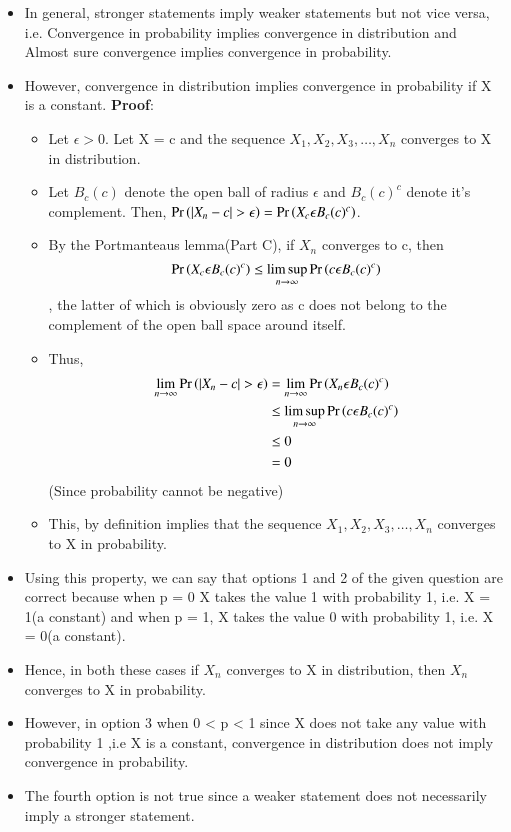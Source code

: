 \documentclass[journal,12pt,twocolumn]{IEEEtran}
\begin{document}
\begin{itemize}
    \item In general, stronger statements imply weaker statements but not vice versa, i.e. Convergence in probability implies convergence in distribution and Almost sure convergence implies convergence in probability.\newline
    \item However, convergence in distribution implies convergence in probability if X is a constant.\newline
    \textbf{Proof}:
    \begin{itemize}
        \item Let $\epsilon > 0$. Let X = c and the sequence $X_1,X_2,X_3, \dots ,X_n$ converges to X in distribution.
        \item Let $B_c(c)$ denote the open ball of radius $\epsilon$ and $B_c(c)^c$ denote it's complement. Then, $\pr{|X_n - c|>\epsilon} = \pr{X_c \epsilon B_c(c)^c}$.
        \item By the Portmanteaus lemma(Part C), if $X_n$ converges to c, then $$\Pr\left(X_c \epsilon B_c(c)^c\right) \leq \limsup_{n \rightarrow \infty} \Pr\left(c \epsilon B_c(c)^c\right)$$, the latter of which is obviously zero as c does not belong to the complement of the open ball space around itself.
        \item Thus,
        \begin{align}
            \lim_{n \rightarrow \infty}\pr{|X_n - c|>\epsilon} &= \lim_{n \rightarrow \infty}\pr{X_n \epsilon B_c(c)^c} \\
            &\leq \limsup_{n \rightarrow \infty}\pr{c \epsilon B_c(c)^c} \\
            &\leq 0 \\
            &= 0 
        \end{align}
        (Since probability cannot be negative)
        \item This, by definition implies that the sequence $X_1,X_2,X_3, \dots ,X_n$ converges to X in probability.
    \end{itemize}
    \item Using this property, we can say that options 1 and 2 of the given question are correct because when p = 0 X takes the value 1 with probability 1, i.e. X = 1(a constant) and when p = 1, X takes the value 0 with probability 1, i.e. X = 0(a constant).
\item Hence, in both these cases if $X_n$ converges to X in distribution, then $X_n$ converges to X in probability.
\item However, in option 3 when 0 < p < 1 since X does not take any value with probability 1 ,i.e X is a constant, convergence in distribution does not imply convergence in probability.
\item The fourth option is not true since a weaker statement does not necessarily imply a stronger statement. 
\end{itemize}
\end{document}
